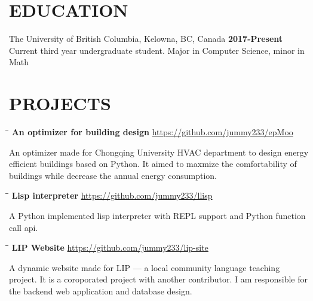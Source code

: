 \documentclass{res}
\begin{document}

\address{jimmy123good@hotmail.com \\ github.com/jummy233\\ (250) 899 2600}
\begin{resume}

\section{EDUCATION }
The University of British Columbia, Kelowna, BC, Canada  \hspace{1.4in} \textbf{2017-Present}\\
    Current third year undergraduate student. Major in Computer Science, minor in Math \\

\section{PROJECTS}
    \vspace{-0.1in}
    \begin{tabbing}
        \hspace{2.4in}\= \hspace{0.3in}\= \kill
        {\bf An optimizer for building design} \>               \>\url{https://github.com/jummy233/epMoo}\\
    \end{tabbing}\vspace{-30pt}
    An optimizer made for Chongqing University HVAC department
    to design energy efficient buildings based on Python.
    It aimed to maxmize the comfortability of buildings while decrease the
    annual energy consumption.

    \vspace{-0.2in}
    \begin{tabbing}
        \hspace{2.4in}\= \hspace{0.3in}\= \kill
        {\bf Lisp interpreter} \>               \>\url{https://github.com/jummy233/llisp}\\
    \end{tabbing}\vspace{-30pt}
    A Python implemented lisp interpreter with REPL support and Python
    function call api.

    \vspace{-0.2in}
    \begin{tabbing}
        \hspace{2.4in}\= \hspace{0.3in}\= \kill
        {\bf LIP Website} \>               \>\url{https://github.com/jummy233/lip-site}\\
    \end{tabbing}\vspace{-30pt}
    A dynamic website made for LIP --- a local community language teaching
    project. It is a coroporated project with another contributor.
    I am responsible for the backend web application and database design.


\end{resume}
\end{document}
